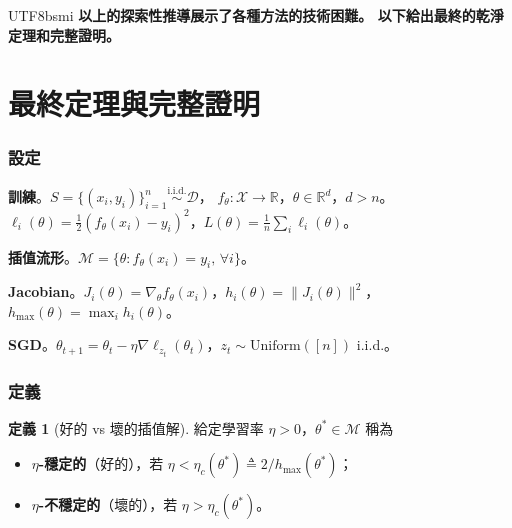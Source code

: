 \documentclass[11pt,a4paper]{article}
\theoremstyle{definition}
\newtheorem{definition}[theorem]{定義}
\newcommand{\R}{\mathbb{R}}
\newcommand{\cM}{\mathcal{M}}
\newcommand{\cX}{\mathcal{X}}
\newcommand{\cD}{\mathcal{D}}
\begin{document}
\begin{CJK}{UTF8}{bsmi}
\textbf{以上的探索性推導展示了各種方法的技術困難。
  以下給出最終的乾淨定理和完整證明。}

\newpage

\part*{最終定理與完整證明}
\setcounter{section}{0}
\setcounter{theorem}{0}

\section{設定}

\textbf{訓練}。$S = \{(x_i,y_i)\}_{i=1}^n \stackrel{\text{i.i.d.}}{\sim}\cD$，
$f_\theta:\cX\to\R$，$\theta\in\R^d$，$d > n$。
$\ell_i(\theta)=\tfrac{1}{2}(f_\theta(x_i)-y_i)^2$，$L(\theta)=\frac{1}{n}\sum_i\ell_i(\theta)$。

\textbf{插值流形}。$\cM=\{\theta:f_\theta(x_i)=y_i,\,\forall i\}$。

\textbf{Jacobian}。$J_i(\theta)=\nabla_\theta f_\theta(x_i)$，$h_i(\theta)=\|J_i(\theta)\|^2$，
$h_{\max}(\theta)=\max_i h_i(\theta)$。

\textbf{SGD}。$\theta_{t+1}=\theta_t-\eta\nabla\ell_{z_t}(\theta_t)$，$z_t\sim\mathrm{Uniform}([n])$ i.i.d.。

\section{定義}

\begin{definition}[好的 vs 壞的插值解]
  給定學習率 $\eta > 0$，$\theta^*\in\cM$ 稱為
  \begin{itemize}
    \item \textbf{$\eta$-穩定的}（好的），若 $\eta < \eta_c(\theta^*) \triangleq 2/h_{\max}(\theta^*)$；
    \item \textbf{$\eta$-不穩定的}（壞的），若 $\eta > \eta_c(\theta^*)$。
  \end{itemize}
\end{definition}


\end{CJK}
\end{document}
